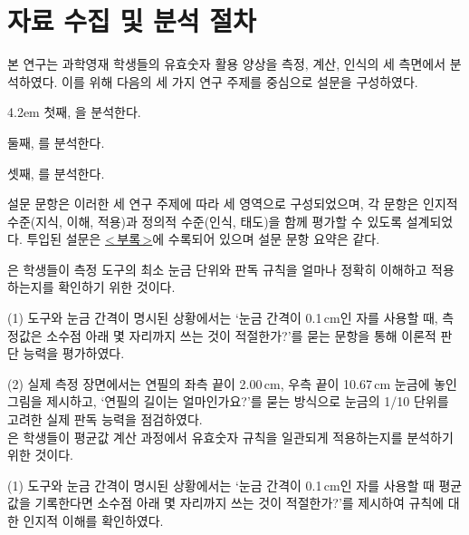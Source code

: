 \section{자료 수집 및 분석 절차}

본 연구는 과학영재 학생들의 유효숫자 활용 양상을
측정, 계산, 인식의 세 측면에서 분석하였다.
이를 위해 다음의 세 가지 연구 주제를 중심으로 설문을 구성하였다.

\vspace*{20pt} \begin{hangblock}{4.2em}
첫째, 을 분석한다.

둘째, 를 분석한다.

셋째, 를 분석한다.
\end{hangblock} \vspace*{20pt}

설문 문항은 이러한 세 연구 주제에 따라 세 영역으로 구성되었으며,
각 문항은 인지적 수준(지식, 이해, 적용)과 정의적 수준(인식, 태도)을 함께 평가할 수 있도록 설계되었다.
투입된 설문은 \hyperref[chap:appendix]{<\,부록\,>}에 수록되어 있으며
설문 문항 요약은 \와 같다. \\

\SurveyItems

은
학생들이 측정 도구의 최소 눈금 단위와 판독 규칙을 얼마나 정확히 이해하고
적용하는지를 확인하기 위한 것이다.

(1) 도구와 눈금 간격이 명시된 상황에서는 `눈금 간격이 0.1\,cm인 자를 사용할 때,
측정값은 소수점 아래 몇 자리까지 쓰는 것이 적절한가?'를 묻는 문항을 통해 이론적 판단 능력을 평가하였다.

(2) 실제 측정 장면에서는 연필의 좌측 끝이 2.00\,cm, 우측 끝이 10.67\,cm 눈금에 놓인 그림을 제시하고,
`연필의 길이는 얼마인가요?'를 묻는 방식으로 눈금의 1/10 단위를 고려한 실제 판독 능력을 점검하였다. \\

은
학생들이 평균값 계산 과정에서 유효숫자 규칙을 일관되게 적용하는지를 분석하기 위한 것이다.

(1) 도구와 눈금 간격이 명시된 상황에서는 `눈금 간격이 0.1\,cm인 자를 사용할 때
평균값을 기록한다면 소수점 아래 몇 자리까지 쓰는 것이 적절한가?'를 제시하여
규칙에 대한 인지적 이해를 확인하였다.

